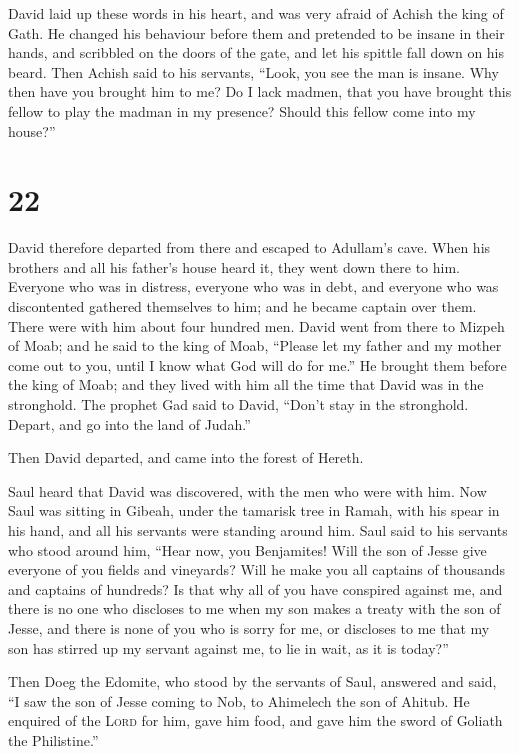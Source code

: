  David laid up these words in his heart, and was very
afraid of Achish the king of Gath.  He changed his
behaviour before them and pretended to be insane in their hands, and
scribbled on the doors of the gate, and let his spittle fall down on his
beard.  Then Achish said to his servants, ``Look, you see
the man is insane. Why then have you brought him to me? 
Do I lack madmen, that you have brought this fellow to play the madman
in my presence? Should this fellow come into my house?''

\hypertarget{section-21}{%
\section{22}\label{section-21}}

 David therefore departed from there and escaped to
Adullam's cave. When his brothers and all his father's house heard it,
they went down there to him.  Everyone who was in
distress, everyone who was in debt, and everyone who was discontented
gathered themselves to him; and he became captain over them. There were
with him about four hundred men.  David went from there to
Mizpeh of Moab; and he said to the king of Moab, ``Please let my father
and my mother come out to you, until I know what God will do for me.''
 He brought them before the king of Moab; and they lived
with him all the time that David was in the stronghold. 
The prophet Gad said to David, ``Don't stay in the stronghold. Depart,
and go into the land of Judah.''

Then David departed, and came into the forest of Hereth.

 Saul heard that David was discovered, with the men who
were with him. Now Saul was sitting in Gibeah, under the tamarisk tree
in Ramah, with his spear in his hand, and all his servants were standing
around him.  Saul said to his servants who stood around
him, ``Hear now, you Benjamites! Will the son of Jesse give everyone of
you fields and vineyards? Will he make you all captains of thousands and
captains of hundreds?  Is that why all of you have
conspired against me, and there is no one who discloses to me when my
son makes a treaty with the son of Jesse, and there is none of you who
is sorry for me, or discloses to me that my son has stirred up my
servant against me, to lie in wait, as it is today?''

 Then Doeg the Edomite, who stood by the servants of Saul,
answered and said, ``I saw the son of Jesse coming to Nob, to Ahimelech
the son of Ahitub.  He enquired of the \textsc{Lord} for
him, gave him food, and gave him the sword of Goliath the Philistine.''

